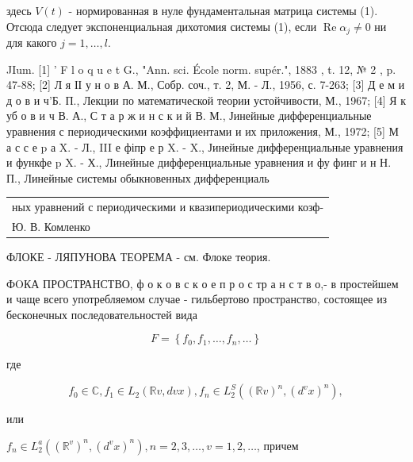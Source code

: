 \documentclass[10pt]{article}
\begin{document}
здесь $V(t)$ - нормированная в нуле фундаментальная матрица системы (1). Отсюда следует экспоненциальная дихотомия системы (1), если $\operatorname{Re} \alpha_{j} \neq 0$ ни для какого $j=1, \ldots, l$.



JIum. [1] ' F l o q u e t G., "Ann. sci. École norm. supér.", 1883 , t. 12, № 2 , p. 47-88; [2] Л я ІІ у н о в А. М., Собр. соч., т. 2, М. - Л., 1956, с. 7-263; [3] Д е м и д о в и ч'Б. П., Лекции по математической теории устойчивости, М., 1967; [4] Я к уб о в и ч В. А., С т а р ж и н с к и й В. М., Јинейные дифференциальные уравнения с периодическими коэффициентами и их приложения, М., 1972; [5] М а с с е p а X. - Л., III е фіпр е р X. - X., Јинейные дифференциальные уравнения и функфе p X. - Х., Линейные дифференциальные уравнения и фу финг и н Н. П., Линейные системы обыкновенных дифференциаль\begin{tabular}{l}

ных уравнений с периодическими и квазипериодическими козф- \\

Ю. В. Комленко \\

\hline

\end{tabular}



ФЛОКЕ - ЛЯПУНОВА ТЕОРЕМА - см. Флоке теория.



ФOКА ПРОСТРАНСТВО, ф о к о в с к о е п р о с тр а н с т в о,- в простейшем и чаще всего употребляемом случае - гильбертово пространство, состоящее из бесконечных последовательностей вида



\[

F=\left\{f_{0}, f_{1}, \ldots, f_{n}, \ldots\right\}

\]



где



\[

f_{0} \in \mathbb{C}, f_{1} \in L_{2}(\mathbb{R} v, d v x), f_{n} \in L_{2}^{S}\left((\mathbb{R} v)^{n},\left(d^{v} x\right)^{n}\right),

\]



или



$f_{n} \in L_{2}^{a}\left(\left(\mathbb{R}^{v}\right)^{n},\left(d^{v} x\right)^{n}\right), n=2,3, \ldots, v=1,2, \ldots$, причем
\end{document}

